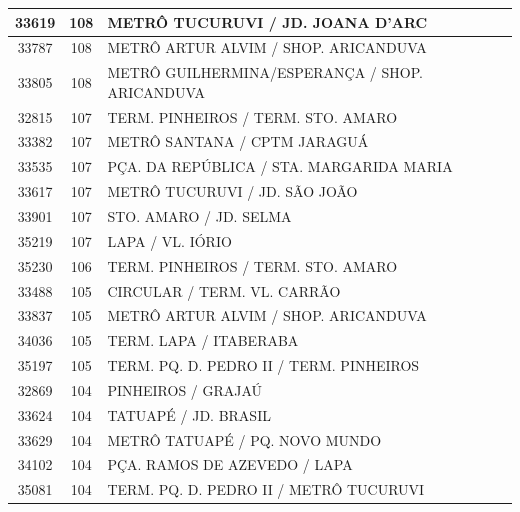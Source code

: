 \documentclass[
	12pt,				%
	oneside,			%
	a4paper,			%
	english,			%
	brazil				%
	]{abntex2ppgsi}
\begin{document}
{{\begin{apendicesenv}
\begin{longtable}{c|c|p{7cm}}
    33619 & 108   & METRÔ TUCURUVI / JD. JOANA D'ARC \\
\hline

    33787 & 108   & METRÔ ARTUR ALVIM / SHOP. ARICANDUVA \\
\hline

    33805 & 108   & METRÔ GUILHERMINA/ESPERANÇA / SHOP. ARICANDUVA \\
\hline

    32815 & 107   & TERM. PINHEIROS / TERM. STO. AMARO \\
\hline

    33382 & 107   & METRÔ SANTANA / CPTM JARAGUÁ \\
\hline

    33535 & 107   & PÇA. DA REPÚBLICA / STA. MARGARIDA MARIA \\
\hline

    33617 & 107   & METRÔ TUCURUVI / JD. SÃO JOÃO \\
\hline

    33901 & 107   & STO. AMARO / JD. SELMA \\
\hline

    35219 & 107   & LAPA / VL. IÓRIO \\
\hline

    35230 & 106   & TERM. PINHEIROS / TERM. STO. AMARO \\
\hline

    33488 & 105   & CIRCULAR / TERM. VL. CARRÃO \\
\hline

    33837 & 105   & METRÔ ARTUR ALVIM / SHOP. ARICANDUVA \\
\hline

    34036 & 105   & TERM. LAPA / ITABERABA \\
\hline

    35197 & 105   & TERM. PQ. D. PEDRO II / TERM. PINHEIROS \\
\hline

    32869 & 104   & PINHEIROS / GRAJAÚ \\
\hline

    33624 & 104   & TATUAPÉ / JD. BRASIL \\
\hline

    33629 & 104   & METRÔ TATUAPÉ / PQ. NOVO MUNDO \\
\hline

    34102 & 104   & PÇA. RAMOS DE AZEVEDO / LAPA \\
\hline

    35081 & 104   & TERM. PQ. D. PEDRO II / METRÔ TUCURUVI \\
\hline


\end{longtable}
\end{apendicesenv}}}
\end{document}
